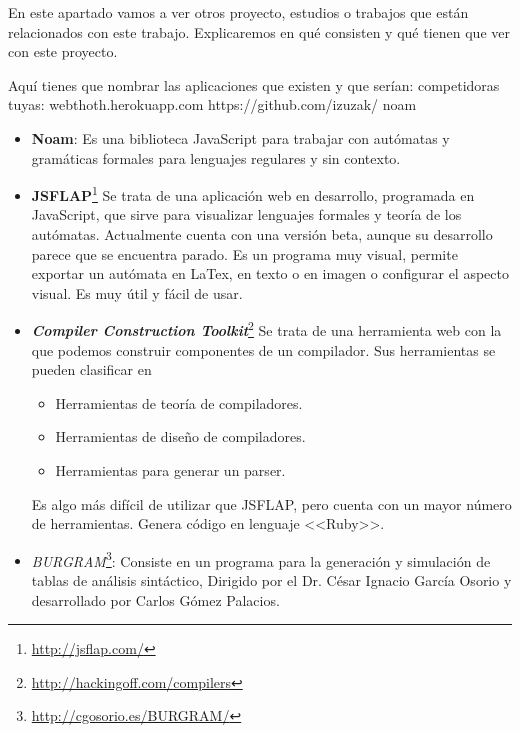 
En este apartado vamos a ver otros proyecto, estudios o trabajos que están relacionados con este trabajo. Explicaremos en qué consisten y qué tienen que ver con este proyecto.


Aquí tienes que nombrar las aplicaciones que existen y que serían: competidoras tuyas:
webthoth.herokuapp.com
https://github.com/izuzak/
noam
\begin{itemize}


\item \textbf{Noam}: Es una biblioteca JavaScript para trabajar con autómatas y gramáticas formales para lenguajes regulares y sin contexto.

\item \textbf{JSFLAP}\footnote{\url{http://jsflap.com/}} Se trata de una aplicación web en desarrollo, programada en JavaScript, que sirve para visualizar lenguajes formales y teoría de los autómatas. Actualmente cuenta con una versión beta, aunque su desarrollo parece que se encuentra parado. Es un programa muy visual, permite exportar un autómata en LaTex, en texto o en imagen o configurar el aspecto visual. Es muy útil y fácil de usar.


\item \emph{\textbf{Compiler Construction Toolkit}}\footnote{\url{http://hackingoff.com/compilers}} Se trata de una herramienta web con la que podemos construir componentes de un compilador. Sus herramientas se pueden clasificar en
\begin{itemize}
\item Herramientas de teoría de compiladores.
\item Herramientas de diseño de compiladores.
\item Herramientas para generar un parser.
\end{itemize}
Es algo más difícil de utilizar que JSFLAP, pero cuenta con un mayor número de herramientas. Genera código en lenguaje <<Ruby>>.

\item \emph{BURGRAM}\footnote{\url{http://cgosorio.es/BURGRAM/}}: Consiste en un programa para la generación y simulación de tablas de análisis sintáctico, Dirigido por el Dr. César Ignacio García Osorio y desarrollado por Carlos Gómez Palacios.
\end{itemize}